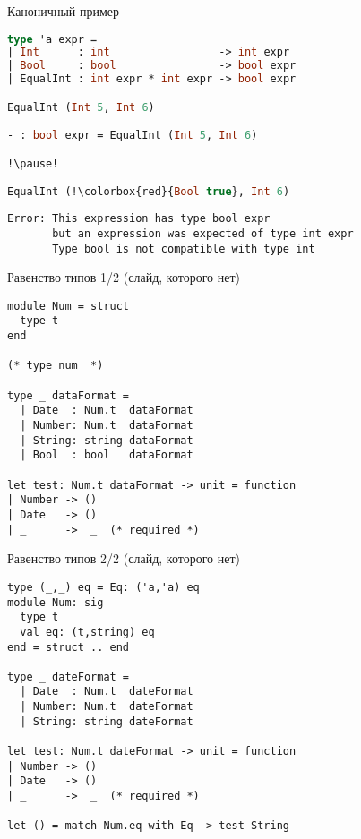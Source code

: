 \documentclass[10pt, mathserif]{beamer}
\theoremstyle{definition}
\begin{document}
\begin{frame}[fragile]{Каноничный пример}
\begin{lstlisting}[language=ocaml,mathescape=true]
type 'a expr =
| Int      : int                 -> int expr
| Bool     : bool                -> bool expr
| EqualInt : int expr * int expr -> bool expr

EqualInt (Int 5, Int 6)

- : bool expr = EqualInt (Int 5, Int 6)

!\pause!

EqualInt (!\colorbox{red}{Bool true}, Int 6)
\end{lstlisting}

\begin{verbatim}
Error: This expression has type bool expr
       but an expression was expected of type int expr
       Type bool is not compatible with type int
\end{verbatim}
\end{frame}

\begin{frame}[fragile]{Равенство типов 1/2 (слайд, которого нет)}
\begin{lstlisting}
module Num = struct
  type t
end

(* type num  *)

type _ dataFormat =
  | Date  : Num.t  dataFormat
  | Number: Num.t  dataFormat
  | String: string dataFormat
  | Bool  : bool   dataFormat

let test: Num.t dataFormat -> unit = function
| Number -> ()
| Date   -> ()
| _      ->  _  (* required *) 
\end{lstlisting}
\end{frame}

\begin{frame}[fragile]{Равенство типов 2/2 (слайд, которого нет)}
\begin{lstlisting}
type (_,_) eq = Eq: ('a,'a) eq
module Num: sig
  type t
  val eq: (t,string) eq
end = struct .. end

type _ dateFormat =
  | Date  : Num.t  dateFormat
  | Number: Num.t  dateFormat
  | String: string dateFormat

let test: Num.t dateFormat -> unit = function
| Number -> ()
| Date   -> ()
| _      ->  _  (* required *) 

let () = match Num.eq with Eq -> test String

\end{lstlisting}
\end{frame}
\end{document}
